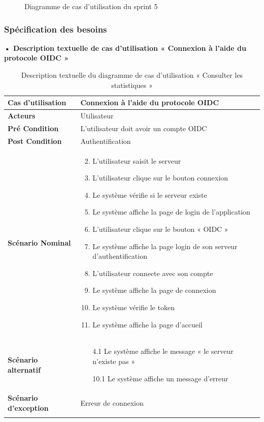 \begin{figure}[H]
  \centering
  \caption{Diagramme de cas d'utilisation du sprint 5}
  \label{fig:UseCaseDiagramSp51}
\end{figure}

\subsubsection{Spécification des besoins}
\textbf{•	Description textuelle de cas d'utilisation « Connexion à l'aide du protocole OIDC  »}

\begin{longtable}{|p{5cm}|p{10cm}|}
\hline
\textbf{Cas d'utilisation}&Connexion à l'aide du protocole OIDC\\
\hline
\textbf{Acteurs}&Utilisateur\\
\hline
\textbf{Pré Condition}&L'utilisateur doit avoir un compte OIDC\\
\hline
\textbf{Post Condition}&Authentification\\
\hline
\textbf{Scénario Nominal}&
\vspace{-\baselineskip}
\begin{enumerate}
  \setcounter{enumi}{1}
    \item L'utilisateur saisit le serveur
    \item L'utilisateur clique sur le bouton connexion
    \item Le système vérifie si le serveur existe
    \item Le système affiche la page de login de l'application
    \item L'utilisateur clique sur le bouton « OIDC »
    \item Le système affiche la page login de son serveur d'authentification
    \item L'utilisateur connecte avec son compte
    \item Le système affiche la page de connexion 
    \item Le système vérifie le token
    \item Le système affiche la page d'accueil 
  
\end{enumerate}\\
\hline
\textbf{Scénario alternatif}&
\vspace{-\baselineskip}
\begin{enumerate}
  \item [4.1] Le système affiche le message « le serveur n'existe pas »
  \item [10.1] Le système affiche un message d'erreur
\end{enumerate}\\
\hline
\textbf{Scénario d'exception}&Erreur de connexion\\
\hline
\caption{Description textuelle du diagramme de cas d'utilisation « Consulter les statistiques »}
\label{tab:use_case_oidc_connect}
\end{longtable}

